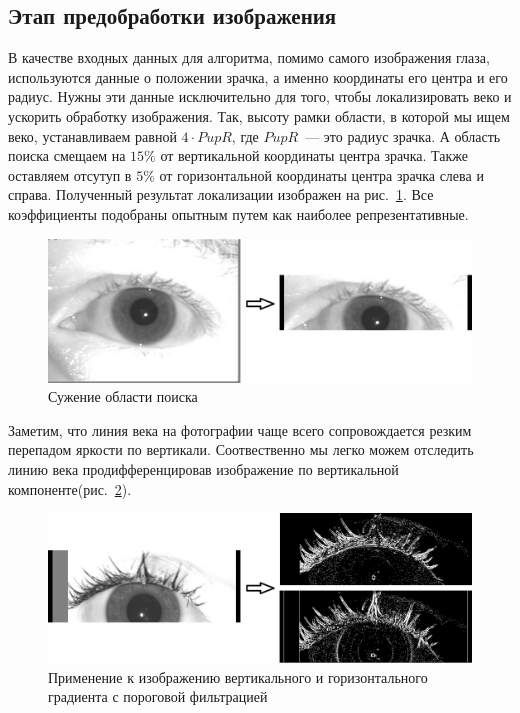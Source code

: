 \documentclass[12pt]{article} %
\begin{document}
\subsection{Этап предобработки изображения}

В качестве входных данных для алгоритма, помимо самого изображения глаза, используются данные о положении зрачка, а именно координаты его центра и его радиус. Нужны эти данные исключительно для того, чтобы локализировать веко и ускорить обработку изображения. Так, высоту рамки области, в которой мы ищем веко, устанавливаем равной $4\cdot PupR$, где $PupR$~--- это радиус зрачка. А область поиска смещаем на $15\%$ от вертикальной координаты центра зрачка. Также оставляем отсутуп в $5\%$ от горизонтальной координаты центра зрачка слева и справа. Полученный результат локализации изображен на рис.~\ref{fig:glaz6}. Все коэффициенты подобраны опытным путем как наиболее репрезентативные.

\begin{figure}[h]
	
	\centering
	
	\includegraphics[width=0.8\linewidth]{glaz6.jpg}
	
	\caption{Сужение области поиска}
	
	\label{fig:glaz6}
	
\end{figure}

Заметим, что линия века на фотографии чаще всего сопровождается резким перепадом яркости по вертикали. Соотвественно мы легко можем отследить линию века продифференцировав изображение по вертикальной компоненте(рис.~\ref{fig:glaz7}).

\begin{figure}[h]
	
	\centering
	
	\includegraphics[width=0.8\linewidth]{glaz7.jpg}
	
	\caption{Применение к изображению вертикального и горизонтального градиента с пороговой фильтрацией}
	
	\label{fig:glaz7}
	
\end{figure}
\end{document}
